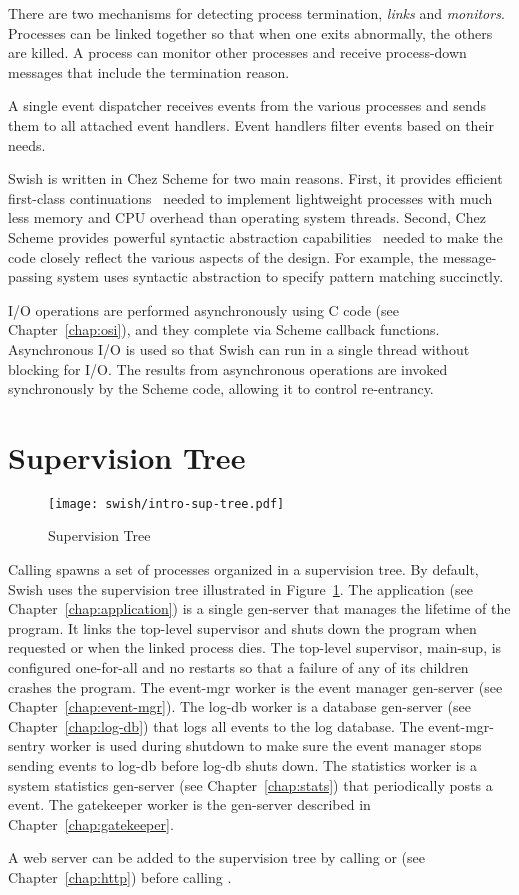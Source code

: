 There are two mechanisms for detecting process termination,
\emph{links} and \emph{monitors}. Processes can be linked together so
that when one exits abnormally, the others are killed. A process can
monitor other processes and receive process-down messages that include
the termination reason.

A single event dispatcher receives events from the various processes
and sends them to all attached event handlers.  Event handlers filter
events based on their needs.

Swish is written in Chez Scheme
for two main reasons. First, it provides efficient first-class
continuations~\cite{one-shot,representing-control} needed to implement
lightweight processes with much less memory and CPU overhead than
operating system threads.  Second, Chez Scheme provides powerful
syntactic abstraction capabilities~\cite{syntactic-abstraction} needed
to make the code closely reflect the various aspects of the
design. For example, the message-passing system uses syntactic
abstraction to specify pattern matching succinctly.

I/O operations are performed asynchronously using C code (see
Chapter~\ref{chap:osi}), and they complete via Scheme callback
functions. Asynchronous I/O is used so that Swish can run in a single
thread without blocking for I/O. The results from asynchronous
operations are invoked synchronously by the Scheme code, allowing it
to control re-entrancy.

\section {Supervision Tree}\label{sec:default-supervision-tree}

\begin{figure}
  \center\texttt{[image: swish/intro-sup-tree.pdf]}
  \caption{\label{fig:intro-sup-tree}Supervision Tree}
\end{figure}

Calling  spawns a set of processes
organized in a supervision tree.
By default, Swish uses the supervision tree illustrated in
Figure~\ref{fig:intro-sup-tree}.
The application (see Chapter~\ref{chap:application}) is a single gen-server
that manages the lifetime of the program.
It links the top-level supervisor and shuts down the program when
requested or when the linked process dies.
The top-level supervisor, main-sup,
is configured one-for-all and no restarts so that a failure of any of
its children crashes the program. The event-mgr worker is the event
manager gen-server (see Chapter~\ref{chap:event-mgr}). The log-db
worker is a database gen-server (see Chapter~\ref{chap:log-db}) that
logs all events to the log database. The event-mgr-sentry worker is
used during shutdown to make sure the event manager stops sending
events to log-db before log-db shuts down. The statistics worker is a
system statistics gen-server (see Chapter~\ref{chap:stats}) that
periodically posts a  event.  The gatekeeper
worker is the gen-server described in Chapter~\ref{chap:gatekeeper}.

A web server can be added to the supervision tree by calling
 or  (see
Chapter~\ref{chap:http}) before calling .
